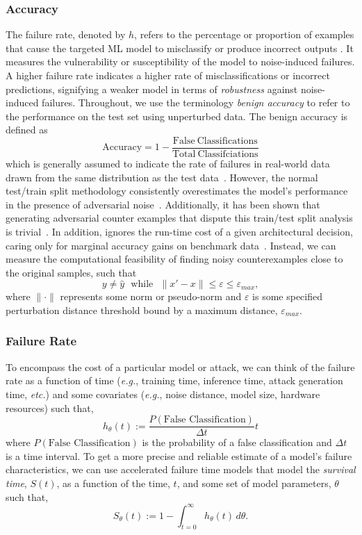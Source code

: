 \documentclass[conference]{IEEEtran}
\begin{document}
\subsubsection{Accuracy}
The failure rate, denoted by $h$, refers to the percentage or proportion of examples that cause the targeted ML model to misclassify or produce incorrect outputs \cite{meyers}. It measures the vulnerability or susceptibility of the model to noise-induced failures. A higher failure rate indicates a higher rate of misclassifications or incorrect predictions, signifying a weaker model in terms of \textit{robustness} against noise-induced failures. Throughout, we use the terminology \textit{benign accuracy} to refer to the performance on the test set using unperturbed data. The benign accuracy is defined as
\begin{equation}
 \mathrm{Accuracy} = 1 - \frac{\mathrm{False~Classifications}}{\mathrm{Total~Classifciations}}
\label{eq:acc}
\end{equation}
which is generally assumed to indicate the rate of failures in real-world data drawn from the same distribution as the test data~\cite{tan2021critical}. However, the normal test/train split methodology consistently overestimates the model's performance in the presence of adversarial noise~\cite{croce_reliable_2020}. Additionally, it has been shown that generating adversarial counter examples that dispute this train/test split analysis is trivial~\cite{biggio_evasion_2013,carlini_towards_2017,adversarialpatch,pixelattack,hopskipjump,biggio_poisoning_2013,chakraborty_adversarial_2018,dohmatob_generalized_2019,meyers}. In addition,  ignores the run-time cost of a given architectural decision, caring only for marginal accuracy gains on benchmark data~\cite{desislavov2021compute,bailly2022effects}. Instead, we can measure the computational feasibility of finding noisy counterexamples close to the original samples, such that 
$$
    y\neq\hat{y}\text{~~while~~}\| x' - x \| \leq \varepsilon \leq \varepsilon_{max},
$$ 
where $\| \cdot \|$ represents some norm or pseudo-norm and $\varepsilon$ is some specified  perturbation distance threshold bound by a maximum distance, $\varepsilon_{max}$.


\subsubsection{Failure Rate}
 To encompass the cost of a particular model or attack, we can think of the failure rate as a function of time (\textit{e.g.}, training time, inference time, attack generation time, \textit{etc.}) and some covariates (\textit{e.g.}, noise distance, model size, hardware resources) such that,
\[
    h_{ \theta}(t) :=  \frac{P(\textrm{False~Classification})}{\Delta t} t
\]
where $P(\textrm{False~Classification})$ is the probability of a false classification and $\Delta t$ is a time interval. To get a more precise and reliable estimate of a model's failure characteristics, we can use accelerated failure time models that model the \textit{survival time}, $S(t)$, as a function of the time, $t$,  and some set of model parameters, $\theta$ such that,
\[
    S_{\theta}(t) := 1 - \int_{t=0}^{\infty} h_{\theta}(t) \,d\theta.
\]
\end{document}
